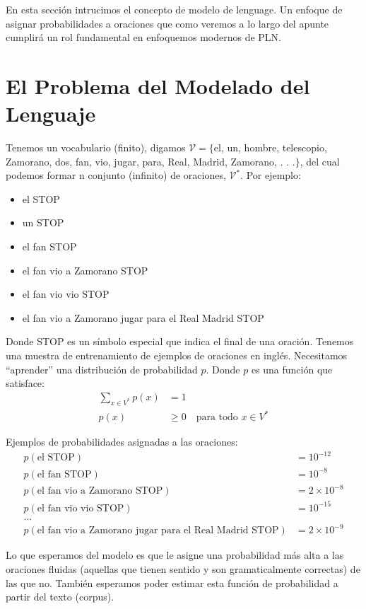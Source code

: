 En esta sección intrucimos el concepto de modelo de lenguage. Un enfoque de asignar probabilidades a oraciones que como veremos a lo largo del apunte cumplirá un rol fundamental en enfoquemos modernos de PLN.


\section{El Problema del Modelado del Lenguaje}

Tenemos un vocabulario (finito), digamos $\mathcal{V} = \{$el, un, hombre, telescopio, Zamorano, dos, fan, vio, jugar, para, Real, Madrid, Zamorano, . . .$\}$, del cual podemos formar n conjunto (infinito) de oraciones, $\mathcal{V}^*$.  Por ejemplo:
\begin{itemize}
\item el STOP
\item un STOP
\item el fan STOP
\item el fan vio a Zamorano STOP
\item el fan vio vio STOP
\item el fan vio a Zamorano jugar para el Real Madrid STOP
\end{itemize}

Donde STOP es un símbolo especial que indica el final de una oración. Tenemos una muestra de entrenamiento de ejemplos de oraciones en inglés. Necesitamos ``aprender'' una distribución de probabilidad $p$. Donde $p$ es una función que satisface:
\begin{align*}
\sum_{x\in V^*} p(x) &= 1 \\
p(x) &\geq 0 \quad \text{para todo } x \in V^*
\end{align*}

Ejemplos de probabilidades asignadas a las oraciones:
\begin{align*}
p(\text{el STOP}) &= 10^{-12} \\
p(\text{el fan STOP}) &= 10^{-8} \\
p(\text{el fan vio a Zamorano STOP}) &= 2 \times 10^{-8} \\
p(\text{el fan vio vio STOP}) &= 10^{-15} \\
\ldots \\
p(\text{el fan vio a Zamorano jugar para el Real Madrid STOP}) &= 2 \times 10^{-9}
\end{align*}

Lo que esperamos del modelo es que le asigne una probabilidad más alta a las oraciones fluidas (aquellas que tienen sentido y son gramaticalmente correctas) de las que no. También esperamos poder estimar esta función de probabilidad a partir del texto (corpus).

